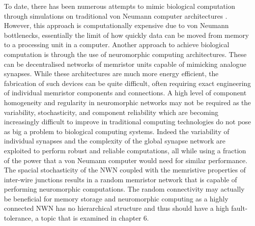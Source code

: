 To date, there has been numerous attempts to mimic biological computation through simulations on traditional von Neumann computer architectures \cite{indiveri2013}. However, this approach is computationally expensive due to von Neumann bottlenecks, essentially the limit of how quickly data can be moved from memory to a processing unit in a computer. Another approach to achieve biological computation is through the use of neuromorphic computing architectures\cite{prezioso2015,yang2013}. These can be decentralised networks of memristor units capable of mimicking analogue synapses. While these architectures are much more energy efficient, the fabrication of such devices can be quite difficult, often requiring exact engineering of individual memristor components and connections. A high level of component homogeneity and regularity in neuromorphic networks may not be required as the variability, stochasticity, and component reliability which are becoming increasingly difficult to improve in traditional computing technologies do not pose as big a problem to biological computing systems\cite{querlioz2013}. Indeed the variability of individual synapses and the complexity of the global synapse network are exploited to perform robust and reliable computations, all while using a fraction of the power that a von Neumann computer would need for similar performance. The spacial stochasticity of the NWN coupled with the memristive properties of inter-wire junctions results in a random memristor network that is capable of performing neuromorphic computations. The random connectivity may actually be beneficial for memory storage and neuromorphic computing as a highly connected NWN has no hierarchical structure and thus should have a high fault-tolerance, a topic that is examined in chapter 6.

